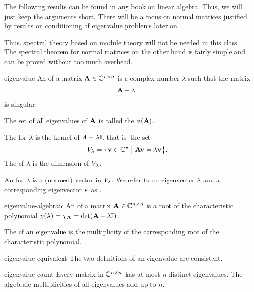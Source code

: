 \begin{intro}
  The following results can be found in any book on linear
  algebra. Thus, we will just keep the arguments short. There will be a
  focus on normal matrices justified by results on conditioning of
  eigenvalue problems later on.

  Thus, spectral theory based on module theory will not be needed in
  this class. The spectral theorem for normal matrices on the other
  hand is fairly simple and can be proved without too much overhead.
\end{intro}

\begin{Definition}{eigenvalue}
  An  of a matrix $\mathbf A\in \mathbb C^{n\times n}$ is a
  complex number $\lambda$ such that the matrix
  \begin{gather}
   \mathbf A-\lambda\mathbb I
  \end{gather}
  is singular.

  The set of all eigenvalues of $\mathbf A$ is called the
   $\sigma(\mathbf A)$.

  The  for $\lambda$ is the kernel of
  $A-\lambda\mathbb I$, that is, the set
\begin{gather}
    V_{\lambda} = \bigl\{
    \mathbf v \in \mathbb C^n \;\big\vert\;
    \mathbf A\mathbf v = \lambda\mathbf v \bigr\}.
\end{gather}
The  of $\lambda$ is the dimension of
$V_{\lambda}$.


An  for $\lambda$ is a (normed) vector in
$V_{\lambda}$. We refer to an eigenvector $\lambda$ and a
corresponding eigenvector $\mathbf v$ as .
\end{Definition}

\begin{Definition}{eigenvalue-algebraic}
  An  of a matrix $\mathbf A\in \mathbb C^{n\times n}$ is a root of the characteristic polynomial $\chi(\lambda) = \chi_{\mathbf A} = \det(\mathbf A-\lambda\mathbb I)$.

  The  of an eigenvalue is the multiplicity of the corresponding root of the characteristic polynomial.
\end{Definition}

\begin{Lemma}{eigenvalue-equivalent}
  The two definitions of an eigenvalue are consistent.
\end{Lemma}

\begin{Theorem}{eigenvalue-count}
  Every matrix in $\mathbb C^{n\times n}$ has at most $n$ distinct eigenvalues. The algebraic multiplicities of all eigenvalues add up to $n$.
\end{Theorem}

